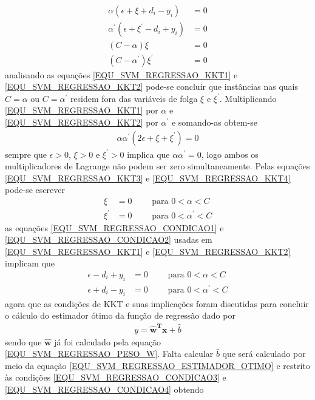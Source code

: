 \begin{align}
\alpha(\epsilon + \xi + d_{i} - y_{i}) &= 0 \label{EQU_SVM_REGRESSAO_KKT1}\\
\alpha^{'}(\epsilon + \xi^{'} - d_{i} + y_{i}) &= 0 \label{EQU_SVM_REGRESSAO_KKT2}\\
(C-\alpha)\xi &= 0 \label{EQU_SVM_REGRESSAO_KKT3}\\
(C-\alpha^{'})\xi^{'} &= 0 \label{EQU_SVM_REGRESSAO_KKT4}
\end{align}
analisando as equações \eqref{EQU_SVM_REGRESSAO_KKT1} e \eqref{EQU_SVM_REGRESSAO_KKT2} pode-se concluir que instâncias nas quais \(C=\alpha\) ou \(C=\alpha^{'}\) residem fora das variáveis de folga \(\xi\) e \(\xi^{'}\). Multiplicando \eqref{EQU_SVM_REGRESSAO_KKT1} por \(\alpha\) e \eqref{EQU_SVM_REGRESSAO_KKT2} por \(\alpha^{'}\) e somando-as obtem-se
\begin{align}
\alpha\alpha^{'}(2\epsilon + \xi + \xi^{'})=0
\end{align}
sempre que \(\epsilon > 0\), \(\xi > 0\) e \(\xi^{'} > 0\) implica que \(\alpha\alpha^{'} = 0\), logo ambos os multiplicadores de Lagrange não podem ser zero simultaneamente. Pelas equações \eqref{EQU_SVM_REGRESSAO_KKT3} e \eqref{EQU_SVM_REGRESSAO_KKT4} pode-se escrever
\begin{align}
\xi  &= 0		\qquad \textrm{ para } 0 < \alpha < C		\label{EQU_SVM_REGRESSAO_CONDICAO1}\\
\xi^{'} &= 0	\qquad \textrm{ para }  0 < \alpha^{'} < C	\label{EQU_SVM_REGRESSAO_CONDICAO2}
\end{align}
as equações \eqref{EQU_SVM_REGRESSAO_CONDICAO1} e \eqref{EQU_SVM_REGRESSAO_CONDICAO2} usadas em \eqref{EQU_SVM_REGRESSAO_KKT1} e \eqref{EQU_SVM_REGRESSAO_KKT2} implicam que  
\begin{align}
\epsilon  - d_{i} + y_{i} &= 0	\qquad \textrm{ para } 0 < \alpha < C		\label{EQU_SVM_REGRESSAO_CONDICAO3}\\
\epsilon  + d_{i} - y_{i} &= 0	\qquad \textrm{ para }  0 < \alpha^{'} < C	\label{EQU_SVM_REGRESSAO_CONDICAO4}
\end{align}
agora que as condições de KKT e suas implicações foram discutidas para concluir o cálculo do estimador ótimo da função de regressão 
dado por 
\begin{align}
y = \mathbf{\hat{w}^{T}x} + \hat{b} \label{EQU_SVM_REGRESSAO_ESTIMADOR_OTIMO}
\end{align}
sendo que \(\mathbf{\hat{w}}\) já foi calculado pela equação \eqref{EQU_SVM_REGRESSAO_PESO_W}. Falta calcular \(\hat{b}\) que será calculado por meio da equação \eqref{EQU_SVM_REGRESSAO_ESTIMADOR_OTIMO} e restrito às condições \eqref{EQU_SVM_REGRESSAO_CONDICAO3} e \eqref{EQU_SVM_REGRESSAO_CONDICAO4} obtendo
